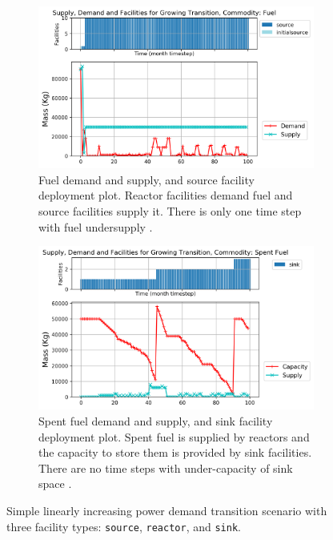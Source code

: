     \begin{figure}[]
        \centering
        \begin{subfigure}[t]{\textwidth}
            \centering
            \includegraphics[width=0.9\linewidth]{figures/growingtransition-fuel.png} 
            \caption{Fuel demand and supply, and source facility deployment plot.
            Reactor facilities demand fuel and source facilities supply it.
            There is only one time step with fuel undersupply \cite{chee_arfc/transition-scenarios_2018}.}
            \label{fig:growingtransition-fuel}
        \end{subfigure}
        \begin{subfigure}[t]{\textwidth}
            \centering
            \includegraphics[width=0.9\linewidth]{figures/growingtransition-spentfuel.png} 
            \caption{Spent fuel demand and supply, and sink facility deployment plot.
                Spent fuel is supplied by reactors and the capacity to store them 
                is provided by sink facilities.
            There are no time steps with under-capacity of sink space \cite{chee_arfc/transition-scenarios_2018}.}
            \label{fig:growingtransition-spentfuel}
        \end{subfigure}
        \caption{Simple linearly increasing power demand transition scenario with 
        three facility types: \texttt{source}, \texttt{reactor}, and \texttt{sink}.}
    \end{figure}
    
